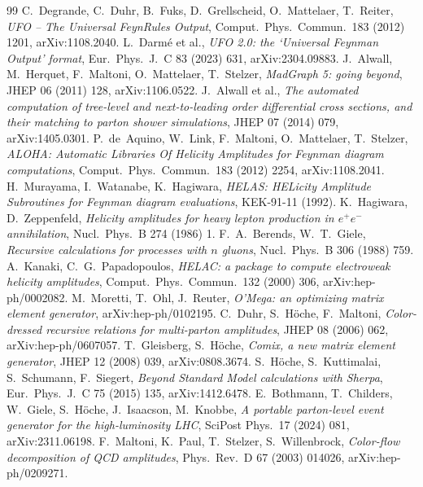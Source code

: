 \documentclass[11pt]{article}
\begin{document}
\begin{thebibliography}{99}\small
{} C.~Degrande, C.~Duhr, B.~Fuks, D.~Grellscheid, O.~Mattelaer, T.~Reiter, \emph{UFO -- The Universal FeynRules Output}, Comput.\ Phys.\ Commun.\ 183 (2012) 1201, arXiv:1108.2040.
 L.~Darm\'e et al., \emph{UFO 2.0: the `Universal Feynman Output' format}, Eur.\ Phys.\ J.\ C 83 (2023) 631, arXiv:2304.09883.
 J.~Alwall, M.~Herquet, F.~Maltoni, O.~Mattelaer, T.~Stelzer, \emph{MadGraph 5: going beyond}, JHEP 06 (2011) 128, arXiv:1106.0522.
 J.~Alwall et al., \emph{The automated computation of tree-level and next-to-leading order differential cross sections, and their matching to parton shower simulations}, JHEP 07 (2014) 079, arXiv:1405.0301.
 P.~de~Aquino, W.~Link, F.~Maltoni, O.~Mattelaer, T.~Stelzer, \emph{ALOHA: Automatic Libraries Of Helicity Amplitudes for Feynman diagram computations}, Comput.\ Phys.\ Commun.\ 183 (2012) 2254, arXiv:1108.2041.
 H.~Murayama, I.~Watanabe, K.~Hagiwara, \emph{HELAS: HELicity Amplitude Subroutines for Feynman diagram evaluations}, KEK-91-11 (1992).
 K.~Hagiwara, D.~Zeppenfeld, \emph{Helicity amplitudes for heavy lepton production in $e^+e^-$ annihilation}, Nucl.\ Phys.\ B 274 (1986) 1.
 F.~A.~Berends, W.~T.~Giele, \emph{Recursive calculations for processes with $n$ gluons}, Nucl.\ Phys.\ B 306 (1988) 759.
 A.~Kanaki, C.~G.~Papadopoulos, \emph{HELAC: a package to compute electroweak helicity amplitudes}, Comput.\ Phys.\ Commun.\ 132 (2000) 306, arXiv:hep-ph/0002082.
 M.~Moretti, T.~Ohl, J.~Reuter, \emph{O'Mega: an optimizing matrix element generator}, arXiv:hep-ph/0102195.
 C.~Duhr, S.~H\"oche, F.~Maltoni, \emph{Color-dressed recursive relations for multi-parton amplitudes}, JHEP 08 (2006) 062, arXiv:hep-ph/0607057.
 T.~Gleisberg, S.~H\"oche, \emph{Comix, a new matrix element generator}, JHEP 12 (2008) 039, arXiv:0808.3674.
 S.~H\"oche, S.~Kuttimalai, S.~Schumann, F.~Siegert, \emph{Beyond Standard Model calculations with Sherpa}, Eur.\ Phys.\ J.\ C 75 (2015) 135, arXiv:1412.6478.
 E.~Bothmann, T.~Childers, W.~Giele, S.~H\"oche, J.~Isaacson, M.~Knobbe, \emph{A portable parton-level event generator for the high-luminosity LHC}, SciPost Phys.\ 17 (2024) 081, arXiv:2311.06198.
 F.~Maltoni, K.~Paul, T.~Stelzer, S.~Willenbrock, \emph{Color-flow decomposition of QCD amplitudes}, Phys.\ Rev.\ D 67 (2003) 014026, arXiv:hep-ph/0209271.

\end{thebibliography}
\end{document}
